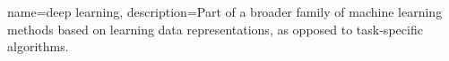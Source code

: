{
    name=deep learning,
    description={Part of a broader family of machine learning methods based on learning data representations, as opposed to task-specific algorithms.}
}
